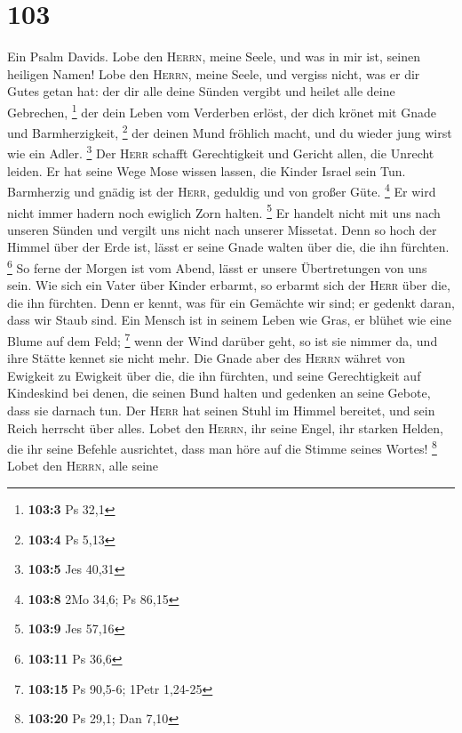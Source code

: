 \hypertarget{section-33}{%
\section{103}\label{section-33}}

 Ein Psalm Davids. Lobe den \textsc{Herrn}, meine Seele,
und was in mir ist, seinen heiligen Namen!  Lobe den
\textsc{Herrn}, meine Seele, und vergiss nicht, was er dir Gutes getan
hat:  der dir alle deine Sünden vergibt und heilet alle
deine Gebrechen, \footnote{\textbf{103:3} Ps 32,1}  der
dein Leben vom Verderben erlöst, der dich krönet mit Gnade und
Barmherzigkeit, \footnote{\textbf{103:4} Ps 5,13}  der
deinen Mund fröhlich macht, und du wieder jung wirst wie ein Adler.
\footnote{\textbf{103:5} Jes 40,31}  Der \textsc{Herr}
schafft Gerechtigkeit und Gericht allen, die Unrecht leiden.
 Er hat seine Wege Mose wissen lassen, die Kinder Israel
sein Tun.  Barmherzig und gnädig ist der \textsc{Herr},
geduldig und von großer Güte. \footnote{\textbf{103:8} 2Mo 34,6; Ps
  86,15}  Er wird nicht immer hadern noch ewiglich Zorn
halten. \footnote{\textbf{103:9} Jes 57,16}  Er handelt
nicht mit uns nach unseren Sünden und vergilt uns nicht nach unserer
Missetat.  Denn so hoch der Himmel über der Erde ist,
lässt er seine Gnade walten über die, die ihn fürchten. \footnote{\textbf{103:11}
  Ps 36,6}  So ferne der Morgen ist vom Abend, lässt er
unsere Übertretungen von uns sein.  Wie sich ein Vater
über Kinder erbarmt, so erbarmt sich der \textsc{Herr} über die, die ihn
fürchten.  Denn er kennt, was für ein Gemächte wir sind;
er gedenkt daran, dass wir Staub sind.  Ein Mensch ist in
seinem Leben wie Gras, er blühet wie eine Blume auf dem Feld;
\footnote{\textbf{103:15} Ps 90,5-6; 1Petr 1,24-25}  wenn
der Wind darüber geht, so ist sie nimmer da, und ihre Stätte kennet sie
nicht mehr.  Die Gnade aber des \textsc{Herrn} währet von
Ewigkeit zu Ewigkeit über die, die ihn fürchten, und seine Gerechtigkeit
auf Kindeskind  bei denen, die seinen Bund halten und
gedenken an seine Gebote, dass sie darnach tun.  Der
\textsc{Herr} hat seinen Stuhl im Himmel bereitet, und sein Reich
herrscht über alles.  Lobet den \textsc{Herrn}, ihr seine
Engel, ihr starken Helden, die ihr seine Befehle ausrichtet, dass man
höre auf die Stimme seines Wortes! \footnote{\textbf{103:20} Ps 29,1;
  Dan 7,10}  Lobet den \textsc{Herrn}, alle seine
